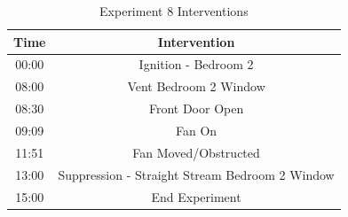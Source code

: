 \documentclass{article}
\begin{document}
\begin{table}[H]
	\centering
	\caption{Experiment 8 Interventions}
	\begin{tabular}{|c|c|} 
		\hline
		Time & Intervention \\ \hline \hline
		00:00 & Ignition - Bedroom 2\\ \hline
		08:00 & Vent Bedroom 2 Window\\ \hline
		08:30 & Front Door Open \\ \hline
		09:09 & Fan On \\ \hline
		11:51 & Fan Moved/Obstructed \\ \hline
		13:00 & Suppression - Straight Stream Bedroom 2 Window \\ \hline
		15:00 & End Experiment \\ \hline
	\end{tabular}
	\label{Table:Exp8Interventions}
\end{table}

\clearpage
\end{document}

